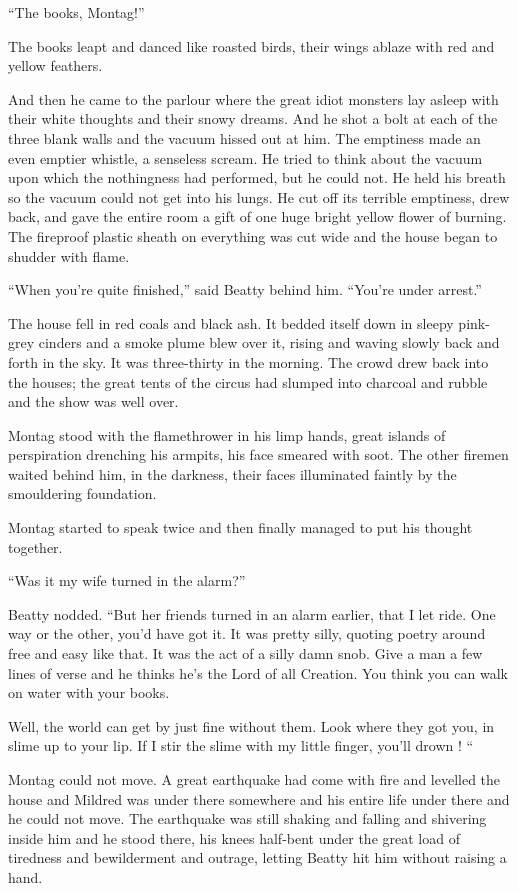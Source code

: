 \documentclass[11pt,openany]{book}
\begin{document}
``The books, Montag!''

The books leapt and danced like roasted birds, their wings ablaze with red and yellow feathers.

And then he came to the parlour where the great idiot monsters lay asleep with their white thoughts and their snowy dreams. And he shot a bolt at each of the three blank walls and the vacuum hissed out at him. The emptiness made an even emptier whistle, a senseless scream. He tried to think about the vacuum upon which the nothingness had performed, but he could not. He held his breath so the vacuum could not get into his lungs. He cut off its terrible emptiness, drew back, and gave the entire room a gift of one huge bright yellow flower of burning. The fireproof plastic sheath on everything was cut wide and the house began to shudder with flame.

``When you're quite finished,'' said Beatty behind him. ``You're under arrest.''

The house fell in red coals and black ash. It bedded itself down in sleepy pink-grey cinders and a smoke plume blew over it, rising and waving slowly back and forth in the sky. It was three-thirty in the morning. The crowd drew back into the houses; the great tents of the circus had slumped into charcoal and rubble and the show was well over.

Montag stood with the flamethrower in his limp hands, great islands of perspiration drenching his armpits, his face smeared with soot. The other firemen waited behind him, in the darkness, their faces illuminated faintly by the smouldering foundation.

Montag started to speak twice and then finally managed to put his thought together.

``Was it my wife turned in the alarm?''

Beatty nodded. ``But her friends turned in an alarm earlier, that I let ride. One way or the other, you'd have got it. It was pretty silly, quoting poetry around free and easy like that. It was the act of a silly damn snob. Give a man a few lines of verse and he thinks he's the Lord of all Creation. You think you can walk on water with your books.

Well, the world can get by just fine without them. Look where they got you, in slime up to your lip. If I stir the slime with my little finger, you'll drown ! ``

Montag could not move. A great earthquake had come with fire and levelled the house and Mildred was under there somewhere and his entire life under there and he could not move. The earthquake was still shaking and falling and shivering inside him and he stood there, his knees half-bent under the great load of tiredness and bewilderment and outrage, letting Beatty hit him without raising a hand.
\end{document}
